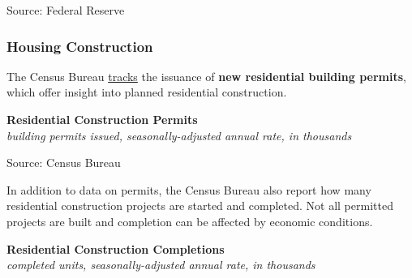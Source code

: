 \documentclass{report}
\makeatletter
\newcommand{\tbllink}[1]{\href{https://raw.githubusercontent.com/bdecon/US-chartbook/master/chartbook/data/#1}{\faTable}}
\newcommand*\short[1]{\expandafter\@gobbletwo\number\numexpr#1\relax}
\newcommand{\dateaxisticks}{
		date coordinates in=x, axis line style={draw=none},
		xmax={2024-01-31},
		max space between ticks=40,	    
		xtick={{1990-01-01}, {1992-01-01}, {1994-01-01}, 
			{1996-01-01}, {1998-01-01}, {2000-01-01}, 
			{2002-01-01}, {2004-01-01}, {2006-01-01},
			{2008-01-01}, {2010-01-01}, {2012-01-01}, {2014-01-01},
		    {2016-01-01}, {2018-01-01}, {2020-01-01}, {2022-01-01}, 
		    {2024-01-01}, {2026-01-01}},
		minor xtick={{1989-01-01}, {1991-01-01}, {1993-01-01},
			{1995-01-01}, {1997-01-01}, {1999-01-01}, 
			{2001-01-01}, {2003-01-01}, {2005-01-01}, {2007-01-01},
		    {2009-01-01}, {2011-01-01}, {2013-01-01}, {2015-01-01},
		    {2017-01-01}, {2019-01-01}, {2021-01-01}, {2023-01-01}, 
		    {2025-01-01}, {2027-01-01}},
		enlarge y limits={0.06}, enlarge x limits={0.01},
		xticklabel style={align=center, yshift=-2pt}, tick label style={inner sep=0pt},
		}
\newcommand{\bbar}[2]{extra #1 ticks = {{#2}}, extra #1 tick labels = ,
		extra #1 tick style = {grid=major, grid style={thick, black!25}},}
\newcommand{\stdline}[4]{\addplot[very thick, no markers, color=#1] 
		table [x=#2, y=#3, col sep=comma] {#4};	}
\newcommand{\rbars}{
		\fill[color=black!10] (axis cs:{1990-07-01},\pgfkeysvalueof{/pgfplots/ymin})
			rectangle (axis cs:{1991-03-01}, \pgfkeysvalueof{/pgfplots/ymax});
		\fill[color=black!10] (axis cs:{2007-12-01},\pgfkeysvalueof{/pgfplots/ymin})
			rectangle (axis cs:{2009-07-01}, \pgfkeysvalueof{/pgfplots/ymax});
		\fill[color=black!10] (axis cs:{2001-03-01},\pgfkeysvalueof{/pgfplots/ymin})
			rectangle (axis cs:{2001-11-01}, \pgfkeysvalueof{/pgfplots/ymax});
		\fill[color=black!10] (axis cs:{2020-02-01},\pgfkeysvalueof{/pgfplots/ymin})
			rectangle (axis cs:{2020-05-01}, \pgfkeysvalueof{/pgfplots/ymax});}
\makeatother
\begin{document}
{\begin{minipage}{0.45\textwidth}
\footnotesize{Source: Federal Reserve} \hfill \tbllink{homeeq.csv}
\end{minipage}
\newpage
\vspace*{-10mm}

\begin{minipage}{1.0\textwidth}  
\subsubsection*{Housing Construction} 
\small The Census Bureau \href{https://www.census.gov/construction/bps/}{tracks} the issuance of \textbf{new residential building permits}, which offer insight into planned residential construction. 
\vspace{0.5mm}

\normalsize{\textbf{Residential Construction Permits}}\\
\footnotesize{\textit{building permits issued, seasonally-adjusted annual rate, in thousands}}
\vspace{2.55cm}

\hspace{6mm} 

\footnotesize{Source: Census Bureau} \hfill \tbllink{permits_total.csv}
\vspace{2.5mm}

\small In addition to data on permits, the Census Bureau also report how many residential construction projects are started and completed. Not all permitted projects are built and completion can be affected by economic conditions. 
\vspace{0.5mm}

\normalsize{\textbf{Residential Construction Completions}}\\
\footnotesize{\textit{completed units, seasonally-adjusted annual rate, in thousands}}
\vspace{2.55cm}


\end{minipage}}
\end{document}
